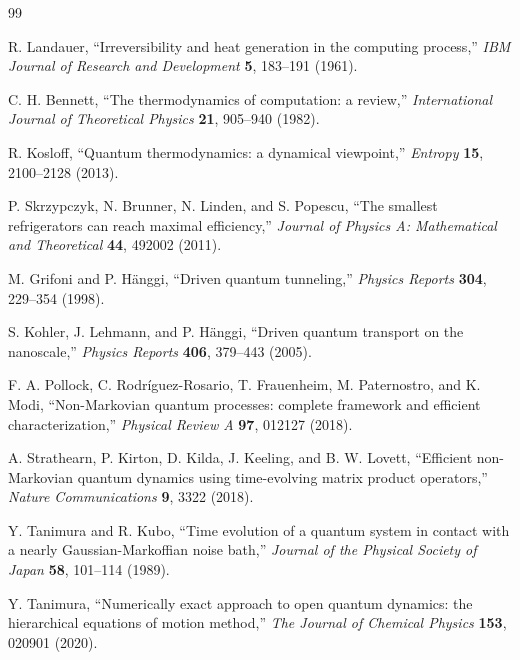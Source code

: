 \documentclass[11pt]{article}
\begin{document}
\begin{thebibliography}{99}

R. Landauer,
``Irreversibility and heat generation in the computing process,''
\emph{IBM Journal of Research and Development} \textbf{5}, 183--191 (1961).

C. H. Bennett,
``The thermodynamics of computation: a review,''
\emph{International Journal of Theoretical Physics} \textbf{21}, 905--940 (1982).

R. Kosloff,
``Quantum thermodynamics: a dynamical viewpoint,''
\emph{Entropy} \textbf{15}, 2100--2128 (2013).

P. Skrzypczyk, N. Brunner, N. Linden, and S. Popescu,
``The smallest refrigerators can reach maximal efficiency,''
\emph{Journal of Physics A: Mathematical and Theoretical} \textbf{44}, 492002 (2011).

M. Grifoni and P. H\"anggi,
``Driven quantum tunneling,''
\emph{Physics Reports} \textbf{304}, 229--354 (1998).

S. Kohler, J. Lehmann, and P. H\"anggi,
``Driven quantum transport on the nanoscale,''
\emph{Physics Reports} \textbf{406}, 379--443 (2005).

F. A. Pollock, C. Rodr\'iguez-Rosario, T. Frauenheim, M. Paternostro, and K. Modi,
``Non-Markovian quantum processes: complete framework and efficient characterization,''
\emph{Physical Review A} \textbf{97}, 012127 (2018).

A. Strathearn, P. Kirton, D. Kilda, J. Keeling, and B. W. Lovett,
``Efficient non-Markovian quantum dynamics using time-evolving matrix product operators,''
\emph{Nature Communications} \textbf{9}, 3322 (2018).

Y. Tanimura and R. Kubo,
``Time evolution of a quantum system in contact with a nearly Gaussian-Markoffian noise bath,''
\emph{Journal of the Physical Society of Japan} \textbf{58}, 101--114 (1989).

Y. Tanimura,
``Numerically exact approach to open quantum dynamics: the hierarchical equations of motion
method,''
\emph{The Journal of Chemical Physics} \textbf{153}, 020901 (2020).

\end{thebibliography}
\end{document}
